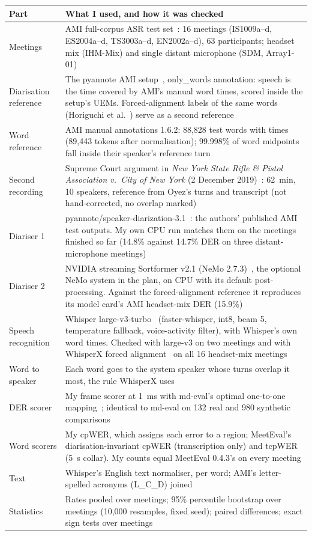 \documentclass[11pt,a4paper]{article}
\begin{document}
\begin{center}
\small
\begin{tabularx}{\textwidth}{@{}>{\raggedright\arraybackslash}p{3.15cm}L@{}}
\toprule
Part & What I used, and how it was checked \\
\midrule
Meetings & AMI full-corpus ASR test set~\cite{ami}: 16 meetings (IS1009a--d, ES2004a--d, TS3003a--d, EN2002a--d), 63 participants; headset mix (IHM-Mix) and single distant microphone (SDM, Array1-01) \\
Diarisation reference & The pyannote AMI setup~\cite{amisetup}, only\_words annotation: speech is the time covered by AMI's manual word times, scored inside the setup's UEMs. Forced-alignment labels of the same words (Horiguchi et al.~\cite{horiguchi}) serve as a second reference \\
Word reference & AMI manual annotations 1.6.2: 88,828 test words with times (89,443 tokens after normalisation); 99.998\% of word midpoints fall inside their speaker's reference turn \\
Second recording & Supreme Court argument in \emph{New York State Rifle \& Pistol Association v.\ City of New York} (2 December 2019)~\cite{oyez}: 62~min, 10 speakers, reference from Oyez's turns and transcript (not hand-corrected, no overlap marked) \\
Diariser 1 & pyannote/speaker-diarization-3.1~\cite{pyannote}: the authors' published AMI test outputs. My own CPU run matches them on the meetings finished so far (14.8\% against 14.7\% DER on three distant-microphone meetings) \\
Diariser 2 & NVIDIA streaming Sortformer v2.1 (NeMo 2.7.3)~\cite{sortformer}, the optional NeMo system in the plan, on CPU with its default post-processing. Against the forced-alignment reference it reproduces its model card's AMI headset-mix DER (15.9\%) \\
Speech recognition & Whisper large-v3-turbo~\cite{whisper} (faster-whisper, int8, beam 5, temperature fallback, voice-activity filter), with Whisper's own word times. Checked with large-v3 on two meetings and with WhisperX forced alignment~\cite{whisperx} on all 16 headset-mix meetings \\
Word to speaker & Each word goes to the system speaker whose turns overlap it most, the rule WhisperX uses \\
DER scorer & My frame scorer at 1~ms with md-eval's optimal one-to-one mapping~\cite{mdeval}; identical to md-eval on 132 real and 980 synthetic comparisons \\
Word scorers & My cpWER, which assigns each error to a region; MeetEval's~\cite{meeteval} diarisation-invariant cpWER (transcription only) and tcpWER (5~s collar). My counts equal MeetEval 0.4.3's on every meeting \\
Text & Whisper's English text normaliser, per word; AMI's letter-spelled acronyms (L\_C\_D) joined \\
Statistics & Rates pooled over meetings; 95\% percentile bootstrap over meetings (10,000 resamples, fixed seed); paired differences; exact sign tests over meetings \\
\bottomrule
\end{tabularx}
\end{center}
\end{document}
